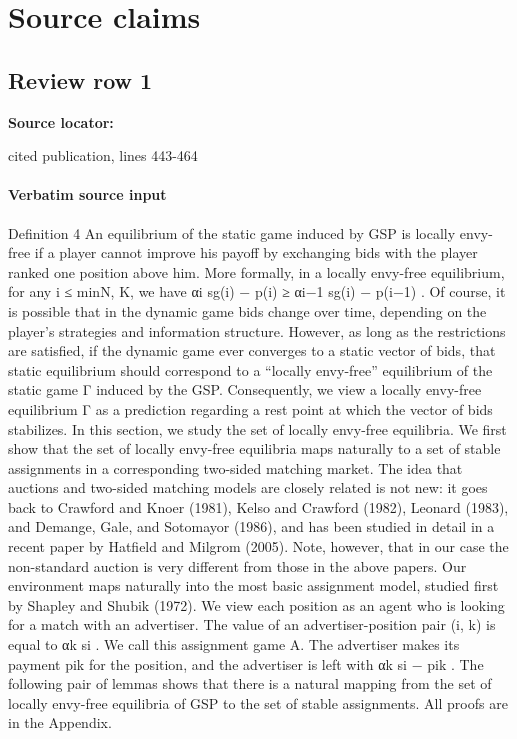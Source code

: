 \documentclass[10pt]{article}
\begin{document}
\clearpage
\hypertarget{source-claim-0fae21de00569e3c}{}
\hypertarget{source-section-f10b5f68e4acf3dc}{}
\section*{Source claims}
\subsection*{Review row 1}
\textbf{Source locator:} {\footnotesize\raggedright cited publication, lines 443-\allowbreak{}464\par}
\paragraph{Verbatim source input}
\begin{ReviewVerbatim}
Definition 4 An equilibrium of the static game induced by GSP is locally envy-free if a player
cannot improve his payoff by exchanging bids with the player ranked one position above him. More
formally, in a locally envy-free equilibrium, for any i ≤ min{N, K}, we have αi sg(i) − p(i) ≥
αi−1 sg(i) − p(i−1) .
Of course, it is possible that in the dynamic game bids change over time, depending on the
player’s strategies and information structure. However, as long as the restrictions are satisfied, if
the dynamic game ever converges to a static vector of bids, that static equilibrium should correspond
to a “locally envy-free” equilibrium of the static game Γ induced by the GSP. Consequently, we
view a locally envy-free equilibrium Γ as a prediction regarding a rest point at which the vector of
bids stabilizes. In this section, we study the set of locally envy-free equilibria.
We first show that the set of locally envy-free equilibria maps naturally to a set of stable
assignments in a corresponding two-sided matching market. The idea that auctions and two-sided
matching models are closely related is not new: it goes back to Crawford and Knoer (1981), Kelso
and Crawford (1982), Leonard (1983), and Demange, Gale, and Sotomayor (1986), and has been
studied in detail in a recent paper by Hatfield and Milgrom (2005). Note, however, that in our case
the non-standard auction is very different from those in the above papers.
Our environment maps naturally into the most basic assignment model, studied first by Shapley
and Shubik (1972). We view each position as an agent who is looking for a match with an advertiser.
The value of an advertiser-position pair (i, k) is equal to αk si . We call this assignment game A.
The advertiser makes its payment pik for the position, and the advertiser is left with αk si − pik .
The following pair of lemmas shows that there is a natural mapping from the set of locally envy-free
equilibria of GSP to the set of stable assignments. All proofs are in the Appendix.
\end{ReviewVerbatim}
\end{document}

